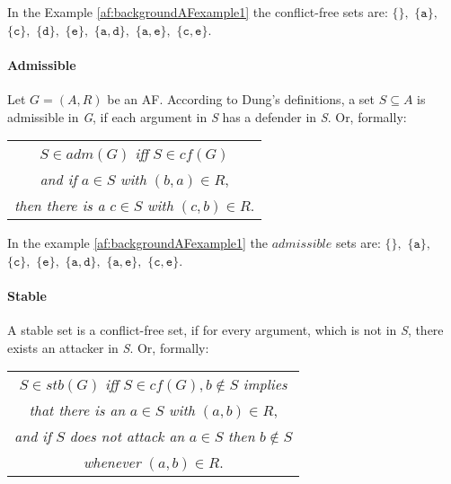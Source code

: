 In the Example \ref{af:backgroundAFexample1} the conflict-free sets are:
$\mathtt{\{\}},$
$\mathtt{\{a\}},$
$\mathtt{\{c\}},$
$\mathtt{\{d\}},$
$\mathtt{\{e\}},$
$\mathtt{\{a, d\}},$
$\mathtt{\{a, e\}},$
$\mathtt{\{c, e\}}$.

\paragraph{Admissible} Let $G=(A,R)$ be an AF. According to Dung's definitions, a set $S \subseteq A$ is admissible in \textit{G}, if each argument in \textit{S} has a defender in \textit{S}. Or, formally:

\begin{center}
    \begin{tabular}{c}
        $S \in adm(G)$ \textit{iff} $S \in cf(G)$\\

        \textit{and if} $a \in S$ \textit{with} $(b, a) \in R$,\\

        \textit{then there is a} $c \in S$ \textit{with} $(c, b) \in R$.
    \end{tabular}
\end{center}

In the example \ref{af:backgroundAFexample1} the $admissible$ sets are:
$\mathtt{\{\}},$
$\mathtt{\{a\}},$
$\mathtt{\{c\}},$
$\mathtt{\{e\}},$
$\mathtt{\{a, d\}},$
$\mathtt{\{a, e\}},$
$\mathtt{\{c, e\}}$.


\paragraph{Stable} A stable set is a conflict-free set, if for every argument, which is not in \textit{S}, there exists an attacker in \textit{S}. Or, formally:

\begin{center}
    \begin{tabular}{c}
        $S \in stb(G)$ \textit{iff} $S \in cf(G),  b \not\in S$ \textit{implies}\\

        \textit{that there is an} $a \in S$ \textit{with} $(a, b) \in R$,\\

        \textit{and if} $S$ \textit{does not attack an} $a \in S$ \textit{then} $b \not\in S$\\

        \textit{whenever} $(a, b) \in R$.
    \end{tabular}
\end{center}


